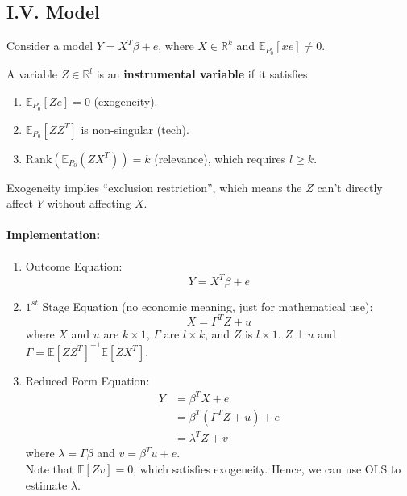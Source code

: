 \documentclass[11pt]{elegantbook}
\begin{document}
\subsection{I.V. Model}
Consider a model $Y=X^T\beta+e$, where $X\in \mathbb{R}^k$ and $\mathbb{E}_{P_0}[xe]\neq 0$.

\begin{definition}
    \normalfont
    A variable $Z\in \mathbb{R}^l$ is an \textbf{instrumental variable} if it satisfies
    \begin{enumerate}[(1).]
        \item $\mathbb{E}_{P_0}[Ze]=0$ (exogeneity).
        \item $\mathbb{E}_{P_0}[ZZ^T]$ is non-singular (tech).
        \item $\text{Rank}(\mathbb{E}_{P_0}(ZX^T))=k$ (relevance), which requires $l\geq k$.
    \end{enumerate}
\end{definition}
\begin{remark}
    Exogeneity implies ``exclusion restriction'', which means the $Z$ can't directly affect $Y$ without affecting $X$.
\end{remark}

\paragraph*{Implementation:}
\begin{enumerate}[$\circ$]
    \item Outcome Equation: $$Y=X^T\beta+e$$
    \item $1^{st}$ Stage Equation (no economic meaning, just for mathematical use): $$X=\Gamma^TZ+u$$
    where $X$ and $u$ are $k\times 1$, $\Gamma$ are $l\times k$, and $Z$ is $l\times 1$. $Z\perp u$ and $\Gamma=\mathbb{E}[ZZ^T]^{-1}\mathbb{E}[ZX^T]$.
    \item Reduced Form Equation:
    \begin{equation}
        \begin{aligned}
            Y&=\beta^TX+e\\
            &=\beta^T(\Gamma^TZ+u)+e\\
            &=\lambda^T Z+v
        \end{aligned}
        \nonumber
    \end{equation}
    where $\lambda=\Gamma\beta$ and $v=\beta^Tu+e$.\\
    Note that $\mathbb{E}[Zv]=0$, which satisfies exogeneity. Hence, we can use OLS to estimate $\lambda$.
\end{enumerate}
\end{document}
